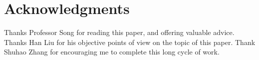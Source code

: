 \documentclass{sig-alternate-05-2015}
\begin{document}
\section{Acknowledgments}
Thanks Professor Song for reading this paper, and offering valuable advice. Thanks Han Liu for his objective points of view on the topic of this paper. Thank Shuhao Zhang for encouraging me to complete this long cycle of work.

\newpage
%

\end{document}
